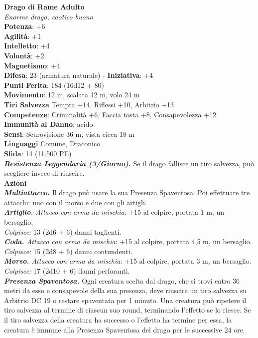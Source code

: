 \begin{multicols}{2}
\medskip\textbf{Drago di Rame Adulto}\\
\emph{Enorme drago, caotico buono}\\
\textbf{Potenza}: +6\\
\textbf{Agilità}: +1\\
\textbf{Intelletto}: +4\\
\textbf{Volontà}: +2\\
\textbf{Magnetismo}: +4\\
\textbf{Difesa}: 23 (armatura naturale) - \textbf{Iniziativa}: +4\\
\textbf{Punti Ferita}: 184 (16d12 + 80)\\
\textbf{Movimento}: 12 m, scalata 12 m, volo 24 m\\
\textbf{Tiri Salvezza} Tempra +14, Riflessi +10, Arbitrio +13\\
\textbf{Competenze}: Criminalità +6, Faccia tosta +8, Consapevolezza +12\\
\textbf{Immunità al Danno}: acido\\
\textbf{Sensi}: Scurovisione 36 m, vista cieca 18 m\\
\textbf{Linguaggi} Comune, Draconico\\
\textbf{Sfida}: 14 (11.500 PE)\smallskip\\
\emph{\textbf{Resistenza Leggendaria (3/Giorno).}} Se il drago fallisce un tiro salvezza, può scegliere invece di riuscire.\\
\smallskip\textbf{Azioni} \\
\emph{\textbf{Multiattacco.}} Il drago può usare la sua Presenza Spaventosa. Poi effettuare tre attacchi: uno con il morso e due con gli artigli.\\
\emph{\textbf{Artiglio.} Attacco con arma da mischia}: +15 al colpire, portata 1 m, un bersaglio.\\
\emph{Colpisce:} 13 (2d6 + 6) danni taglienti.\\
\emph{\textbf{Coda.} Attacco con arma da mischia}: +15 al colpire, portata 4,5 m, un bersaglio.\\
\emph{Colpisce:} 15 (2d8 + 6) danni contundenti.\\
\emph{\textbf{Morso.} Attacco con arma da mischia}: +15 al colpire, portata 3 m, un bersaglio.\\
\emph{Colpisce:} 17 (2d10 + 6) danni perforanti.\\
\emph{\textbf{Presenza Spaventosa.}} Ogni creatura scelta dal drago, che si trovi entro 36 metri da esso e consapevole della sua presenza, deve riuscire un tiro salvezza su Arbitrio DC  19 o restare spaventata per 1 minuto. Una creatura può ripetere il tiro salvezza al termine di ciascun suo round, terminando l'effetto se lo riesce. Se il tiro salvezza della creatura ha successo o l'effetto ha termine per essa, la creatura è immune alla Presenza Spaventosa del drago per le successive 24 ore. \\

\end{multicols}
